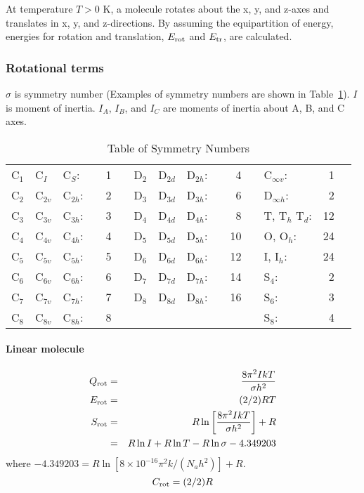 At temperature $T>0$ K, a molecule rotates about  the  x,  y,  and z-axes  and
translates  in  x,  y,  and  z-directions.  By assuming the
 equipartition of energy, energies for rotation
and translation,  $E_{\rm rot}$ and $E_{\rm tr}$, are calculated.

\subsubsection{Rotational terms}
$\sigma$ is symmetry number (Examples of symmetry numbers are shown
in Table~\ref{rot}). $I$ is moment of inertia.
$I_A$, $I_B$, and $I_C$ are moments of inertia about A, B, and C axes.
\begin{table}
\caption{\label{rot} Table of Symmetry Numbers }
\begin{center}
\begin{tabular}{lllcrclllcrclrr}
\hline
C$_1$&C$_I $    &C$_S $:&&   1&&D$_2$&D$_{2d}$&D$_{2h}$:&&4 &&  C$_{\infty v}$:& 1  \\
C$_2$&C$_{2v}$&C$_{2h}$:&&  2 &&D$_3$&D$_{3d}$&D$_{3h}$:&&6 &&  D$_{\infty h}$:&
2  \\
C$_3$&C$_{3v}$&C$_{3h}$:&&  3 &&D$_4$&D$_{4d}$&D$_{4h}$:&&8 && T, T$_h$ T$_d$: &12  \\
C$_4$&C$_{4v}$&C$_{4h}$:&&  4 &&D$_5$&D$_{5d}$&D$_{5h}$:&&10  &&  O, O$_h $:   &24  \\
C$_5$&C$_{5v}$&C$_{5h}$:&&  5 &&D$_6$&D$_{6d}$&D$_{6h}$:&&12  &&  I, I$_h$:  &24
\\
C$_6$&C$_{6v}$&C$_{6h}$:&&  6 &&D$_7$&D$_{7d}$&D$_{7h}$:&&14  && S$_4$:&2
\\
C$_7$&C$_{7v}$&C$_{7h}$:&&  7 &&D$_8$&D$_{8d}$&D$_{8h}$:&&16  && S$_6$: &3 \\
C$_8$&C$_{8v}$&C$_{8h}$:&&  8 &&      &       &         && &   &  S$_8$: &4 \\\hline
\end{tabular}
\end{center}
\end{table}

\paragraph*{Linear molecule}
\begin{eqnarray}
Q_{\rm rot} & = & \frac{8\pi^2 IkT}{\sigma h^2} \nonumber\label{eq10} \\
E_{\rm rot} & = & (2/2)RT  \nonumber\label{eq11} \\
S_{\rm rot} & = &  R \ln \left[ \frac{8\pi^2 IkT}{\sigma h^2} \right] + R
\nonumber\label{eq12} \\
            & = & R \ln I + R \ln T - R \ln\sigma - 4.349 203  \nonumber
\end{eqnarray}
where $ -4.349 203 = R \ln[8\times 10^{-16} \pi^2 k/(N_a h^2)] + R$.
\begin{equation}
C_{\rm rot} = (2/2)R    \nonumber\label{eq14}
\end{equation}

